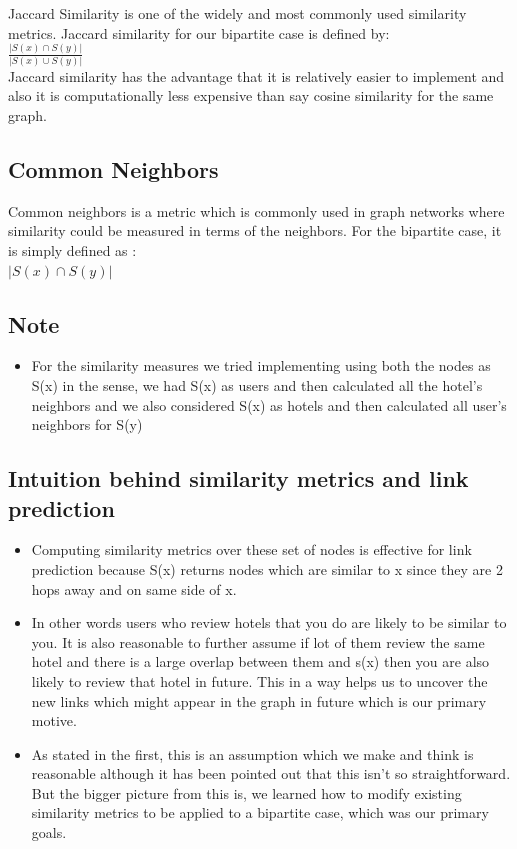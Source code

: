 \documentclass[letterpaper,twocolumn,11pt]{article}
\begin{document}
Jaccard Similarity is one of the widely and most commonly used similarity metrics. Jaccard similarity for our bipartite case is defined by:\\
$\frac {| S(x) \cap S(y) |}{| S(x) \cup S(y) |}$ \\

Jaccard similarity has the advantage that it is relatively easier to implement and also it is computationally less expensive than say cosine similarity for the same graph.

\subsection{Common Neighbors}
Common neighbors is a metric which is commonly used in graph networks where similarity could be measured in terms of the neighbors. For the bipartite case, it is simply defined as :\\
$|S(x) \cap S(y)|$


\subsection{Note}
 \begin{itemize}
 \item For the similarity measures we tried implementing using both the nodes as S(x) in the sense, we had S(x) as users and then calculated all the hotel's neighbors and we also considered S(x) as hotels and then calculated all user's neighbors for S(y)
 \end{itemize}

\subsection{Intuition behind similarity metrics and link prediction}

\begin{itemize}
\item Computing similarity metrics over these set of nodes is effective for link prediction because S(x) returns nodes which are similar to x since they are 2 hops away and on same side of x.

\item In other words users who review hotels that you do are likely to be similar to you. It is also reasonable to further assume if lot of them review the same hotel and there is a large overlap between them and s(x) then you are also likely to review that hotel in future. This in a way helps us to uncover the new links which might appear in the graph in future which is our primary motive.

\item As stated in the first, this is an assumption which we make and think is reasonable although it has been pointed out that this isn't so straightforward. But the bigger picture from this is, we learned how to modify existing similarity metrics to be applied to a bipartite case, which was our primary goals.

\end{itemize}
\end{document}
